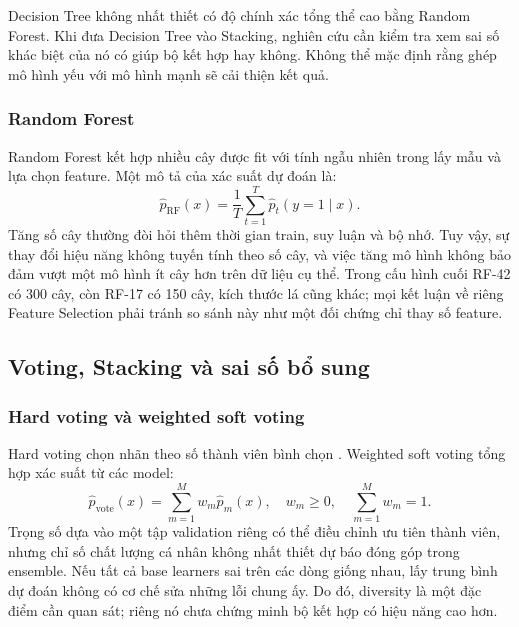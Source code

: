 Decision Tree không nhất thiết có độ chính xác tổng thể cao bằng Random Forest. Khi đưa Decision Tree vào Stacking, nghiên cứu cần kiểm tra xem sai số khác biệt của nó có giúp bộ kết hợp hay không. Không thể mặc định rằng ghép mô hình yếu với mô hình mạnh sẽ cải thiện kết quả.

\subsubsection{Random Forest}
Random Forest kết hợp nhiều cây được fit với tính ngẫu nhiên trong lấy mẫu và lựa chọn feature. Một mô tả của xác suất dự đoán là:
\begin{equation}
\widehat p_{\mathrm{RF}}(x)=\frac{1}{T}\sum_{t=1}^{T}\widehat p_t(y=1\mid x).
\label{eq:rf}
\end{equation}
Tăng số cây thường đòi hỏi thêm thời gian train, suy luận và bộ nhớ. Tuy vậy, sự thay đổi hiệu năng không tuyến tính theo số cây, và việc tăng mô hình không bảo đảm vượt một mô hình ít cây hơn trên dữ liệu cụ thể. Trong cấu hình cuối RF-42 có 300 cây, còn RF-17 có 150 cây, kích thước lá cũng khác; mọi kết luận về riêng Feature Selection phải tránh so sánh này như một đối chứng chỉ thay số feature.

\subsection{Voting, Stacking và sai số bổ sung}
\subsubsection{Hard voting và weighted soft voting}
Hard voting chọn nhãn theo số thành viên bình chọn \cite{legacyL01,legacyL05}. Weighted soft voting tổng hợp xác suất từ các model:
\begin{equation}
\widehat p_{\mathrm{vote}}(x)=\sum_{m=1}^{M}w_m\widehat p_m(x),\quad
w_m\ge 0,\quad\sum_{m=1}^{M}w_m=1.
\label{eq:voting}
\end{equation}
Trọng số dựa vào một tập validation riêng có thể điều chỉnh ưu tiên thành viên, nhưng chỉ số chất lượng cá nhân không nhất thiết dự báo đóng góp trong ensemble. Nếu tất cả base learners sai trên các dòng giống nhau, lấy trung bình dự đoán không có cơ chế sửa những lỗi chung ấy. Do đó, diversity là một đặc điểm cần quan sát; riêng nó chưa chứng minh bộ kết hợp có hiệu năng cao hơn.

